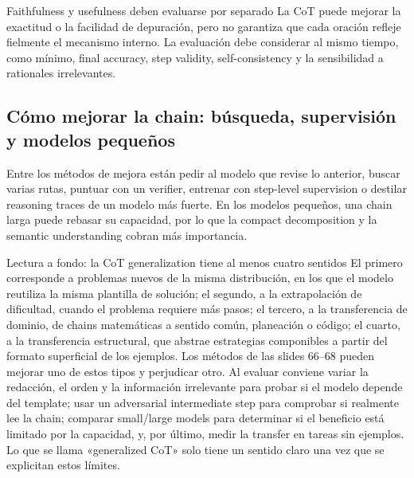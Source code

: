 
\begin{warningbox}{Faithfulness y usefulness deben evaluarse por separado}
La CoT puede mejorar la exactitud o la facilidad de depuración, pero no garantiza que cada oración refleje fielmente el mecanismo interno. La evaluación debe considerar al mismo tiempo, como mínimo, final accuracy, step validity, self-consistency y la sensibilidad a rationales irrelevantes.
\end{warningbox}

\subsection{Cómo mejorar la chain: búsqueda, supervisión y modelos pequeños}

Entre los métodos de mejora están pedir al modelo que revise lo anterior, buscar varias rutas, puntuar con un verifier, entrenar con step-level supervision o destilar reasoning traces de un modelo más fuerte. En los modelos pequeños, una chain larga puede rebasar su capacidad, por lo que la compact decomposition y la semantic understanding cobran más importancia.







\begin{knowledgebox}{Lectura a fondo: la CoT generalization tiene al menos cuatro sentidos}
El primero corresponde a problemas nuevos de la misma distribución, en los que el modelo reutiliza la misma plantilla de solución; el segundo, a la extrapolación de dificultad, cuando el problema requiere más pasos; el tercero, a la transferencia de dominio, de chains matemáticas a sentido común, planeación o código; el cuarto, a la transferencia estructural, que abstrae estrategias componibles a partir del formato superficial de los ejemplos. Los métodos de las slides 66--68 pueden mejorar uno de estos tipos y perjudicar otro. Al evaluar conviene variar la redacción, el orden y la información irrelevante para probar si el modelo depende del template; usar un adversarial intermediate step para comprobar si realmente lee la chain; comparar small/large models para determinar si el beneficio está limitado por la capacidad, y, por último, medir la transfer en tareas sin ejemplos. Lo que se llama «generalized CoT» solo tiene un sentido claro una vez que se explicitan estos límites.
\end{knowledgebox}

